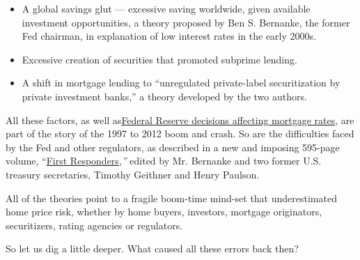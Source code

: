 \begin{itemize}
\tightlist
\item
  A global savings glut --- excessive saving worldwide, given available
  investment opportunities, a theory proposed by Ben S. Bernanke, the
  former Fed chairman, in explanation of low interest rates in the early
  2000s.
\end{itemize}

\begin{itemize}
\tightlist
\item
  Excessive creation of securities that promoted subprime lending.
\end{itemize}

\begin{itemize}
\tightlist
\item
  A shift in mortgage lending to ``unregulated private-label
  securitization by private investment banks,'' a theory developed by
  the two authors.
\end{itemize}

All these factors, as well
as\href{https://www.bankrate.com/mortgages/30-year-mortgage-rates/?pointsChanged=false\&searchChanged=true\&mortgageType=Purchase\&zipCode=11968\&partnerId=br3\&ttcid\&userCreditScore=740\&userVeteranStatus=NoMilitaryService\&userHadPriorVaLoan=false\&userHasVaDisabilities=false\&userFirstTimeHomebuyer=false\&userQuickClosing=false\&userFha=false\&userLowUpfrontCosts=false\&userLowPayment=false\&purchasePrice=580000\&purchaseDownPayment=116000\&purchasePropertyType=SingleFamily\&purchasePropertyUse=PrimaryResidence\&purchaseLoanTerms=30yr\&purchasePoints=All\&refinancePropertyValue=580000\&refinanceLoanAmount=464000\&refinancePropertyType=SingleFamily\&refinancePropertyUse=PrimaryResidence\&refinanceCashOutAmount=0\&refinancePoints=All\&refinanceLoanTerms=30yr}{Federal
Reserve decisions affecting mortgage rates}, are part of the story of
the 1997 to 2012 boom and crash. So are the difficulties faced by the
Fed and other regulators, as described in a new and imposing 595-page
volume,
``\href{https://yalebooks.yale.edu/book/9780300244441/first-responders}{First
Responders},\emph{''} edited by Mr. Bernanke and two former U.S.
treasury secretaries, Timothy Geithner and Henry Paulson.

All of the theories point to a fragile boom-time mind-set that
underestimated home price risk, whether by home buyers, investors,
mortgage originators, securitizers, rating agencies or regulators.

So let us dig a little deeper. What caused all these errors back then?

